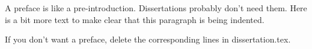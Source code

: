A preface is like a pre-introduction.
Dissertations probably don't need them.
Here is a bit more text to make clear that this paragraph is being indented.

If you don't want a preface, delete the corresponding lines in dissertation.tex.